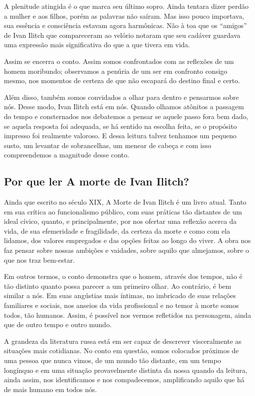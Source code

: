 \documentclass[12pt]{extarticle}
\begin{document}
A plenitude atingida é o que marca seu último sopro. Ainda tentara dizer
perdão a mulher e aos filhos, porém as palavras não saíram. Mas isso
pouco importava, sua essência e consciência estavam agora harmônicas.
Não à toa que os ``amigos'' de Ivan Ilitch que compareceram ao velório
notaram que seu cadáver guardava uma expressão mais significativa do que
a que tivera em vida.

Assim se encerra o conto. Assim somos confrontados com as reflexões de
um homem moribundo; observamos a penúria de um ser em confronto consigo
mesmo, nos momentos de certeza de que não escapará do destino final e
certo.

Além disso, também somos convidados a olhar para dentro e pensarmos
sobre nós. Desse modo, Ivan Ilitch está em nós. Quando olhamos atônitos
a passagem do tempo e consternados nos debatemos a pensar se aquele
passo fora bem dado, se aquela resposta foi adequada, se há sentido na
escolha feita, se o propósito impresso foi realmente valoroso. E dessa
leitura talvez tenhamos um pequeno susto, um levantar de sobrancelhas,
um menear de cabeça e com isso compreendemos a magnitude desse conto.

\subsection{Por que ler A morte de Ivan Ilitch?}

Ainda que escrito no século XIX, A Morte de Ivan Ilitch é um livro
atual. Tanto em sua crítica ao funcionalismo público, com suas práticas
tão distantes de um ideal cívico, quanto, e principalmente, por nos
ofertar uma reflexão acerca da vida, de sua efemeridade e fragilidade,
da certeza da morte e como com ela lidamos, dos valores empregados e das
opções feitas ao longo do viver. A obra nos faz pensar sobre nossas
ambições e vaidades, sobre aquilo que almejamos, sobre o que nos traz
bem-estar.

Em outros termos, o conto demonstra que o homem, através dos tempos, não
é tão distinto quanto possa parecer a um primeiro olhar. Ao contrário, é
bem similar a nós. Em suas angústias mais íntimas, no imbricado de suas
relações familiares e sociais, nos anseios da vida profissional e no
temor à morte somos todos, tão humanos. Assim, é possível nos vermos
refletidos na personagem, ainda que de outro tempo e outro mundo.

A grandeza da literatura russa está em ser capaz de descrever
visceralmente as situações mais cotidianas. No conto em questão, somos
colocados próximos de uma pessoa que nunca vimos, de um mundo tão
distante, em um tempo longínquo e em uma situação provavelmente distinta
da nossa quando da leitura, ainda assim, nos identificamos e nos
compadecemos, amplificando aquilo que há de mais humano em todos nós.
\end{document}
